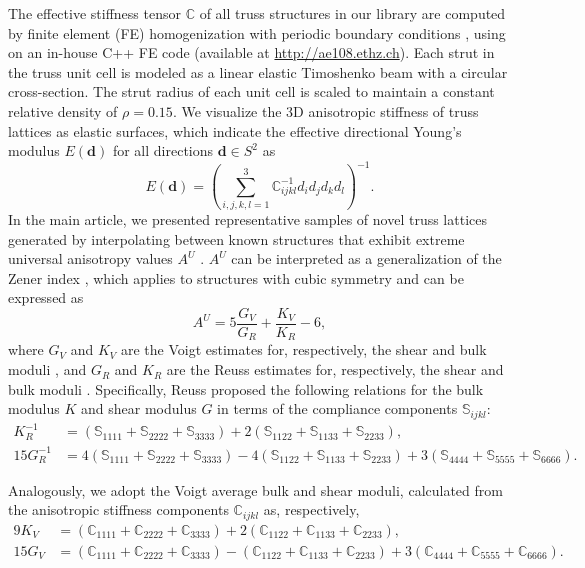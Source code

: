 \documentclass[fleqn,10pt]{wlscirep}
\begin{document}
The effective stiffness tensor $\mathbb{C}$ of all truss structures in our library are computed by finite element (FE) homogenization with periodic boundary conditions \cite{glaesener2020continuum}, using on an in-house C++ FE code (available at \href{http://ae108.ethz.ch}{http://ae108.ethz.ch}). Each strut in the truss unit cell is modeled as a linear elastic Timoshenko beam with a circular cross-section. The strut radius of each unit cell is scaled to maintain a constant relative density of $\rho = 0.15$. We visualize the 3D anisotropic stiffness of truss lattices as elastic surfaces, which indicate the effective directional Young’s modulus $E(\boldsymbol{d})$ for all directions $\boldsymbol{d}\in S^2$ as
\begin{equation}
    E(\boldsymbol{d}) = \left(\sum_{i,j,k,l=1}^{3}\mathbb{C}^{-1}_{ijkl}d_i d_j d_k d_l\right)^{-1}.
\end{equation}
In the main article, we presented representative samples of novel truss lattices generated by interpolating between known structures that exhibit extreme universal anisotropy values $A^U$ \cite{ranganathan2008universal}. $A^U$ can be interpreted as a generalization of the Zener index \cite{zener1949elasticity}, which applies to structures with cubic symmetry and can be expressed as
\begin{equation}
    A^U = 5\dfrac{G_V}{G_R}+\dfrac{K_V}{K_R}-6,
\end{equation}
where $G_V$ and $K_V$ are the Voigt estimates for, respectively, the shear and bulk moduli \cite{voigt1910lehrbuch}, and $G_R$ and $K_R$ are the Reuss estimates for, respectively, the shear and bulk moduli \cite{reuss1929berechnung}. Specifically, Reuss proposed the following relations for the bulk modulus $K$ and shear modulus $G$ in terms of the compliance components $\mathbb{S}_{ijkl}$:
\begin{align}
K_R^{-1} &= (\mathbb{S}_{1111}+\mathbb{S}_{2222}+\mathbb{S}_{3333})+2(\mathbb{S}_{1122}+\mathbb{S}_{1133}+\mathbb{S}_{2233}), \\
15 G_R^{-1} &= 4(\mathbb{S}_{1111}+\mathbb{S}_{2222}+\mathbb{S}_{3333}) - 4(\mathbb{S}_{1122}+\mathbb{S}_{1133}+\mathbb{S}_{2233})+3(\mathbb{S}_{4444}+\mathbb{S}_{5555}+\mathbb{S}_{6666})   . 
\end{align}

Analogously, we adopt the Voigt average bulk and shear moduli, calculated from the anisotropic stiffness components $\mathbb{C}_{ijkl}$ as, respectively,
\begin{align}
9 K_V &= (\mathbb{C}_{1111}+\mathbb{C}_{2222}+\mathbb{C}_{3333})+2(\mathbb{C}_{1122}+\mathbb{C}_{1133}+\mathbb{C}_{2233}), \\
15 G_V &= (\mathbb{C}_{1111}+\mathbb{C}_{2222}+\mathbb{C}_{3333}) - (\mathbb{C}_{1122}+\mathbb{C}_{1133}+\mathbb{C}_{2233})+3(\mathbb{C}_{4444}+\mathbb{C}_{5555}+\mathbb{C}_{6666})    .
\end{align}
\end{document}
